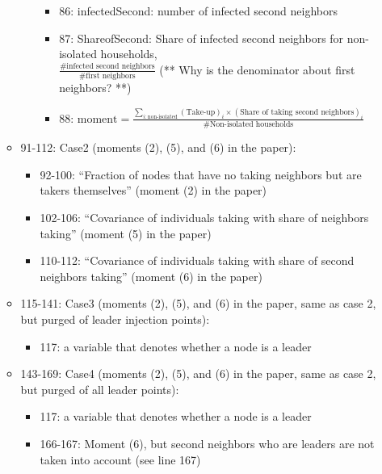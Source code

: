 \documentclass[10pt,letterpaper]{article}
\begin{document}
\begin{itemize}
\begin{itemize}
\begin{itemize}
\begin{itemize}
              \item 86: infectedSecond: number of infected second neighbors
              \item 87: ShareofSecond: Share of infected second neighbors for non-isolated households, \\
                $\frac{\text{\# infected second neighbors}}{\text{\# first neighbors}}$ (** Why is the denominator about first neighbors? **)
              \item 88: $\text{moment} = \frac{\sum_{i: \text{non-isolated}} (\text{Take-up})_i \times (\text{Share of taking second neighbors})_i}{\text{\# Non-isolated households}}$
            \end{itemize}
        \end{itemize}
      \item 91-112: Case2 (moments (2), (5), and (6) in the paper):
        \begin{itemize}
          \item 92-100: ``Fraction of nodes that have no taking neighbors but are takers themselves'' (moment (2) in the paper)
          \item 102-106: ``Covariance of individuals taking with share of neighbors taking'' (moment (5) in the paper)
          \item 110-112: ``Covariance of individuals taking with share of second neighbors taking'' (moment (6) in the paper)
        \end{itemize}
      \item 115-141: Case3 (moments (2), (5), and (6) in the paper, same as case 2, but purged of leader injection points):
        \begin{itemize}
          \item 117: a variable that denotes whether a node is a leader
        \end{itemize}
      \item 143-169: Case4 (moments (2), (5), and (6) in the paper, same as case 2, but purged of all leader points):
        \begin{itemize}
          \item 117: a variable that denotes whether a node is a leader
          \item 166-167: Moment (6), but second neighbors who are leaders are not taken into account (see line 167)
        \end{itemize}
    \end{itemize}
\end{itemize}
\end{document}
